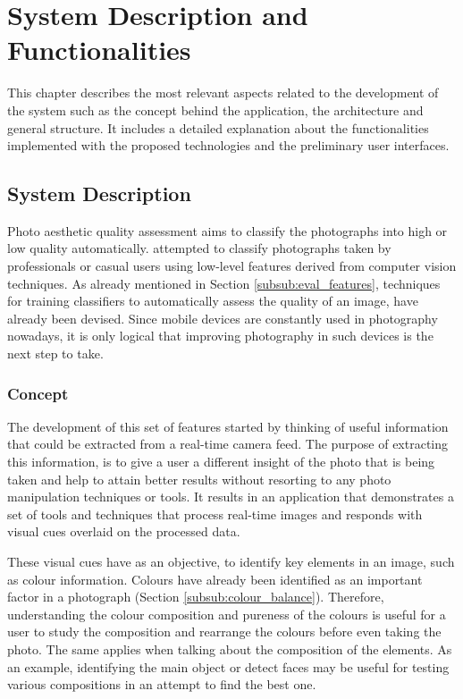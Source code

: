 
\chapter{System Description and Functionalities}
\label{cha:system}

This chapter describes the most relevant aspects related to the development of the system such as the concept behind the application, the architecture and general structure. It includes a detailed explanation about the functionalities implemented with the proposed technologies and the preliminary user interfaces.

\section{System Description}
\label{sec:system_description}

Photo aesthetic quality assessment aims to classify the photographs into high or low quality automatically. \citeauthor{tong2005classification} \cite{tong2005classification} attempted to classify photographs taken by professionals or casual users using low-level features derived from computer vision techniques. As already mentioned in Section \ref{subsub:eval_features}, techniques for training classifiers to automatically assess the quality of an image, have already been devised. Since mobile devices are constantly used in photography nowadays, it is only logical that improving photography in such devices is the next step to take.

\subsection{Concept}
The development of this set of features started by thinking of useful information that could be extracted from a real-time camera feed. The purpose of extracting this information, is to give a user a different insight of the photo that is being taken and help to attain better results without resorting to any photo manipulation techniques or tools. It results in an application that demonstrates a set of tools and techniques that process real-time images and responds with visual cues overlaid on the processed data.

These visual cues have as an objective, to identify key elements in an image, such as colour information. Colours have already been identified as an important factor in a photograph (Section \ref{subsub:colour_balance}). Therefore, understanding the colour composition and pureness of the colours is useful for a user to study the composition and rearrange the colours before even taking the photo. The same applies when talking about the composition of the elements. As an example, identifying the main object or detect faces may be useful for testing various compositions in an attempt to find the best one.

